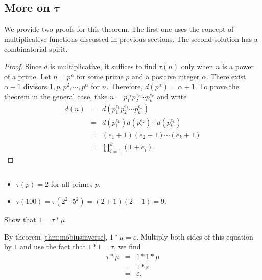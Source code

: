 \documentclass[12pt]{subfile}
\begin{document}
		

		
\subsection{More on \texorpdfstring{$\boldsymbol{\tau}$}{\texttau(n)}}\label{sec:d(n)}

We provide two proofs for this theorem. The first one uses the concept of multiplicative functions discussed in previous sections. The second solution has a combinatorial spirit.

	\begin{proof}
		Since $d$ is multiplicative, it suffices to find $\tau(n)$ only when $n$ is a power of a prime. Let $n=p^\alpha$ for some prime $p$ and a positive integer $\alpha$. There exist $\alpha+1$ divisors $1, p, p^2, \cdots, p^\alpha$ for $n$. Therefore, $d(p^\alpha)=\alpha + 1$. To prove the theorem in the general case, take $n=p_1^{e_1}p_2^{e_2}\cdots p_k^{e_k}$ and write
			\begin{eqnarray*}
				d(n) &=& d(p_1^{e_1}p_2^{e_2}\cdots p_k^{e_k})\\
					 &=& d(p_1^{e_1}) d(p_2^{e_2})\cdots d(p_k^{e_k})\\
					 &=& (e_1+1)(e_2+1)\cdots (e_k+1)\\
					 &=& \prod_{i=1}^{k} (1+e_i).
			\end{eqnarray*}
	\end{proof}
	
	\begin{example}
		$ $
		\begin{itemize}
			\item $\tau(p)=2$ for all primes $p$.
			\item $\tau(100) = \tau(2^2 \cdot 5^2) = (2+1)(2+1)=9$.
		\end{itemize}
	\end{example}
	
	
	
	\begin{problem}
		Show that $1 = \tau \ast \mu$.
	\end{problem}
	
	\begin{solution}
		By theorem \eqref{thm:mobiusinverse}, $1 \ast \mu =\varepsilon$. Multiply both sides of this equation by $1$ and use the fact that $1\ast 1 = \tau$, we find
			\begin{eqnarray*}
				\tau \ast \mu &=& 1 \ast 1 \ast \mu \\
							  &=& 1 \ast \varepsilon\\
							  &=& \varepsilon.
			\end{eqnarray*}
	\end{solution}
\end{document}
